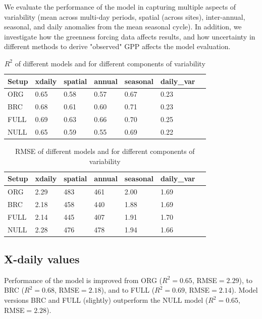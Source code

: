 \documentclass{myreport}
\begin{document}
We evaluate the performance of the model in capturing multiple aspects of variability (mean across multi-day periods, spatial (across sites), inter-annual, seasonal, and daily anomalies from the mean seasonal cycle). In addition, we investigate how the greenness forcing data affects results, and how uncertainty in different methods to derive "observed" GPP affects the model evaluation.

\begin{table}
\centering
\begin{tabular}{lllllll}
  \toprule
  Setup & xdaily & spatial & annual & seasonal & daily\_var \\ 
  \midrule
  ORG & 0.65 & 0.58 & 0.57 & 0.67 & 0.23 \\ 
  BRC & 0.68 & 0.61 & 0.60 & 0.71 & 0.23 \\ 
  FULL & 0.69 & 0.63 & 0.66 & 0.70 & 0.25 \\ 
  NULL & 0.65 & 0.59 & 0.55 & 0.69 & 0.22 \\ 
  \bottomrule
  \end{tabular}
\caption{$R^2$ of different models and for different components of variability} 
\label{tab:rsq}
\end{table}

\begin{table}
\centering
\begin{tabular}{lllllll}
  \toprule
  Setup & xdaily & spatial & annual & seasonal & daily\_var \\ 
  \midrule
  ORG & 2.29 & 483 & 461 & 2.00 & 1.69 \\ 
  BRC & 2.18 & 458 & 440 & 1.88 & 1.69 \\ 
  FULL & 2.14 & 445 & 407 & 1.91 & 1.70 \\ 
  NULL & 2.28 & 476 & 478 & 1.94 & 1.66 \\ 
  \bottomrule
  \end{tabular}
\caption{RMSE of different models and for different components of variability} 
\label{tab:rmse}
\end{table}

\clearpage

\subsection{X-daily values}

Performance of the model is improved from ORG ($R^2=0.65$, RMSE$=2.29$), to BRC ($R^2=0.68$, RMSE$=2.18$), and to FULL ($R^2=0.69$, RMSE$=2.14$). Model versions BRC and FULL (slightly) outperform the NULL model ($R^2=0.65$, RMSE$=2.28$).
\end{document}

